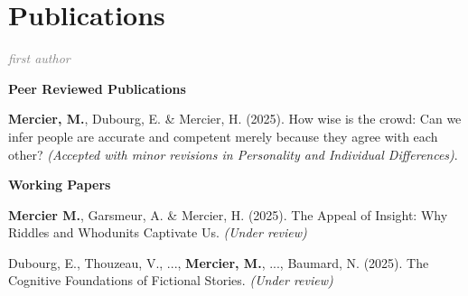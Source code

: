 \documentclass[letterpaper,11pt]{article}
\newcommand{\resumeItem}[1]{
  \item\small{
    {#1 \vspace{-2pt}}
  }
}
\newcommand{\resumeItemWithYear}[3][ ]{ %
  \item\small{
    #2 \hfill {\small #3} \\
    #1
  }
}
\newcommand{\resumePublicationHeading}[1]{
  \vspace{5pt} %
  \noindent\textbf{\small #1} %
  \vspace{2pt} %
}
\begin{document}
\section{Publications}


\small

\noindent\textcolor{gray}{\textit{\footnotemark[1]first author}}
\vspace{5pt} %

\resumePublicationHeading{Peer Reviewed Publications}
\begin{etaremune}
    \resumeItem{\textbf{Mercier, M.\footnotemark[1]}, Dubourg, E. \& Mercier, H. (2025). How wise is the crowd: Can we infer people are accurate and competent merely because they agree with each other? \emph{(Accepted with minor revisions in Personality and Individual Differences)}.
    }
\end{etaremune}


\resumePublicationHeading{Working Papers}
\begin{etaremune}
    \resumeItem{\textbf{Mercier M.\footnotemark[1]}, Garsmeur, A. \& Mercier, H. (2025). The Appeal of Insight: Why Riddles and Whodunits Captivate Us. \emph{(Under review)}
    }
    \resumeItem{Dubourg, E., Thouzeau, V., ..., \textbf{Mercier, M.}, ..., Baumard, N. (2025). The Cognitive Foundations of Fictional Stories. \emph{(Under review)}
    }

\end{etaremune}



\end{document}
